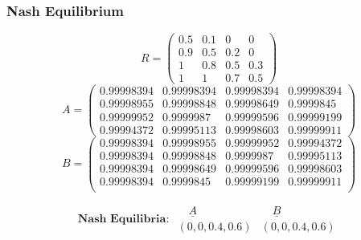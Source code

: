 \begin{frame}
    \frametitle{Nash Equilibrium}
    \centering

    \scriptsize
    \begin{equation*}
        R =  
        \begin{pmatrix}
            0.5 & 0.1 & 0 & 0 \\
            0.9 & 0.5 & 0.2 & 0 \\
            1 & 0.8 & 0.5 & 0.3 \\
            1 & 1 & 0.7 & 0.5
        \end{pmatrix}
    \end{equation*}
    \begin{equation*}
        A = 
        \begin{pmatrix}
            0.99998394 & 0.99998394 & 0.99998394 & 0.99998394 \\
            0.99998955 & 0.99998848 & 0.99998649 & 0.9999845 \\
            0.99999952 & 0.9999987  & 0.99999596 & 0.99999199 \\
            0.99994372 & 0.99995113 & 0.99998603 & 0.99999911
        \end{pmatrix}
    \end{equation*}
    \begin{equation*}
        B = 
        \begin{pmatrix}
            0.99998394 & 0.99998955 & 0.99999952 & 0.99994372 \\
            0.99998394 & 0.99998848 & 0.9999987  & 0.99995113 \\
            0.99998394 & 0.99998649 & 0.99999596 & 0.99998603 \\
            0.99998394 & 0.9999845  & 0.99999199 & 0.99999911 \\
        \end{pmatrix}
    \end{equation*}

    \begin{equation*}
        \textbf{Nash Equilibria: } 
        \begin{array}{cc}
            \underline{\quad A \quad} & \underline{\quad B \quad} \\
            (0, 0, 0.4, 0.6) & (0, 0, 0.4, 0.6) 
        \end{array}
    \end{equation*}
\end{frame}


